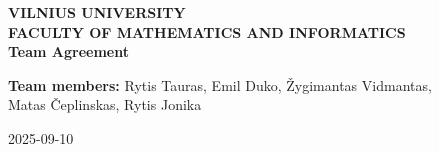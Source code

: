 \begin{titlepage}
    \begin{center}
        \textbf{VILNIUS UNIVERSITY}\\
        \textbf{FACULTY OF MATHEMATICS AND INFORMATICS}\\
        \vspace*{1cm}
        \textbf{Team Agreement}\\
    \end{center}
    \vspace*{5cm}
    \begin{flushright}
        \textbf{Team members:}
        Rytis Tauras, Emil Duko, Žygimantas Vidmantas,\\Matas Čeplinskas, Rytis Jonika
    \end{flushright}
    \vfill
    \begin{center}
        2025-09-10
    \end{center}
\end{titlepage}